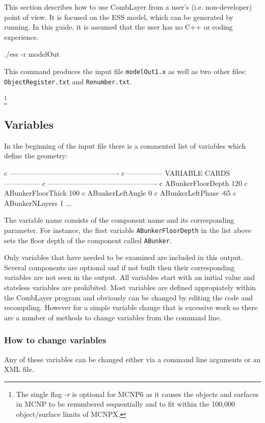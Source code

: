 This section describes how to use CombLayer from a user's (i.e. non-developer) point of view.
It is focused on the ESS model, which can be generated by running. In this guide, it is assumed that
the user has no C++ or coding experience.

\begin{bash}
  ./ess -r modelOut
\end{bash}

This command produces the \mcnp input file {\tt modelOut1.x} as well as two other files: {\tt ObjectRegister.txt} and {\tt Renumber.txt}.

\footnote{The single flag {\it -r} is optional for MCNP6 as it causes the objects and surfaces in MCNP to be renumbered sequentially and
to fit within the 100,000 object/surface limits of MCNPX.}

\subsection{Variables}
In the beginning of the input file there is a commented list of variables which define the geometry:

\begin{deck}
 c ----------------------------------------------
 c --------------- VARIABLE CARDS ---------------
 c ----------------------------------------------
 c ABunkerFloorDepth 120
 c ABunkerFloorThick 100
 c ABunkerLeftAngle 0
 c ABunkerLeftPhase -65
 c ABunkerNLayers 1
 ...
\end{deck}

The variable name consists of the component name and its corresponding parameter. For instance,
the first variable {\tt ABunkerFloorDepth} in the list above sets the floor depth of the component called {\tt ABunker}.

Only variables that have needed to be examined are included in this output. Several components are optional and if not built then
their corresponding variables are not seen in the output. All variables start with an initial value and stateless variables are prohibited.
Most variables are defined appropiately within the CombLayer program and obviously can be changed by editing the code and recompiling.
However for a simple variable change that is excessive work so there are a number of methods to change variables from the command line.

\subsubsection{How to change variables}
Any of these variables can be changed either via a command line arguments or an XML file.

